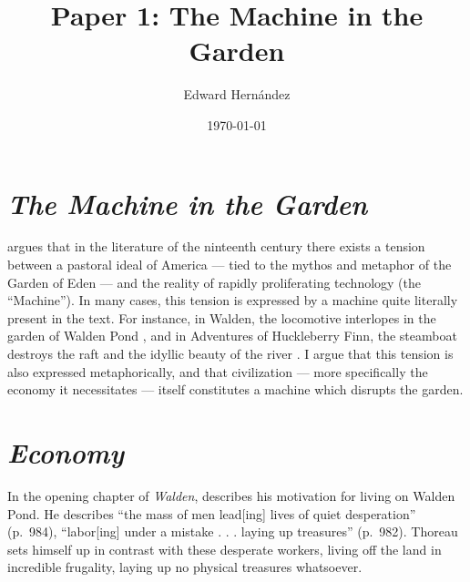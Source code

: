 \documentclass[man,12pt,natbib]{apa6}
\begin{document}
\title{Paper 1: The Machine in the Garden}
\author{Edward Hern\'{a}ndez}
\date{\today}
\maketitle

\section{\emph{The Machine in the Garden}}


\citet{Marx64} argues that in the literature of the ninteenth century there
exists a tension between a pastoral ideal of America --- tied to the mythos and
metaphor of the Garden of Eden --- and the reality of rapidly proliferating
technology (the ``Machine''). In many cases, this tension is expressed by a
machine quite literally present in the text. For instance, in Walden, the
locomotive interlopes in the garden of Walden Pond \citep[ch.~4]{Thoreau12},
and in Adventures of Huckleberry Finn, the steamboat destroys the raft and the
idyllic beauty of the river \citep[ch.~16]{Twain85}.  I argue that this tension
is also expressed metaphorically, and that civilization --- more specifically
the economy it necessitates --- itself constitutes a machine which disrupts the
garden.


\section{\emph{Economy}}


In the opening chapter of \emph{Walden}, \citet{Thoreau12} describes his
motivation for living on Walden Pond. He describes ``the mass of men lead[ing]
lives of quiet desperation'' (p.~984), ``labor[ing] under a mistake . . .
laying up treasures'' (p.~982).
Thoreau sets himself up in contrast with these desperate workers, living off
the land in incredible frugality, laying up no physical treasures whatsoever.
\end{document}
